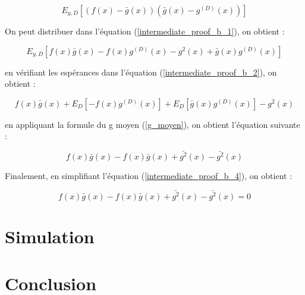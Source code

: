 \documentclass[a4paper]{article}
\begin{document}
\begin{equation}
	\label{intermediate_proof_b_1}
	E_{y,D} [(f(x)-\bar{g}(x)) (\bar{g}(x) - g^{(D)}(x)) ]
\end{equation}

On peut distribuer dans l'équation (\ref{intermediate_proof_b_1}), on obtient :

\begin{equation}
		\label{intermediate_proof_b_2}
	E_{y,D} [ f(x)\bar{g}(x) - f(x)g^{(D)}(x) -g^2(x) + \bar{g}(x)g^{(D)}(x)]
\end{equation}

en vérifiant les espérances dans l'équation (\ref{intermediate_proof_b_2}), on obtient :

\begin{equation}
	\label{intermediate_proof_b_3}
	f(x)\bar{g}(x) + E_{D} [- f(x)g^{(D)}(x)] + E_{D} [ \bar{g}(x)g^{(D)}(x)] -g^2(x)
\end{equation}

en appliquant la formule du g moyen (\ref{g_moyen}), on obtient l'équation suivante :

\begin{equation}
	\label{intermediate_proof_b_4}
	f(x)\bar{g}(x) - f(x)\bar{g}(x) + \bar{g^2}(x) -\bar{g^2}(x)
\end{equation}

Finalement, en simplifiant l'équation (\ref{intermediate_proof_b_4}), on obtient :

\begin{equation}
	\label{intermediate_proof_b_5}
	f(x)\bar{g}(x) - f(x)\bar{g}(x) + \bar{g^2}(x) -\bar{g^2}(x) = 0
\end{equation}

\newpage

\section{Simulation}
 
\newpage

\section{Conclusion}

\newpage
\end{document}
